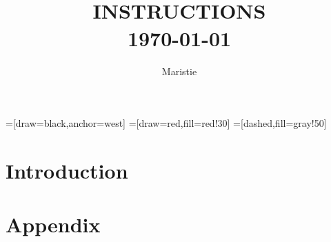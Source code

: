 


=[draw=black,anchor=west]
=[draw=red,fill=red!30]
=[dashed,fill=gray!50]
\title{
        \HRule{2pt}\\
        \LARGE \textbf{\uppercase{Instructions}}
        \HRule{2pt} \\ [0.5cm]
        \normalsize \today \vspace*{5\baselineskip}}

\date{}

\author{Maristie}

\maketitle
\tableofcontents
\setcounter{page}{0}
\thispagestyle{empty}
\newpage

\section*{Introduction}

\newpage
\section*{Appendix}



